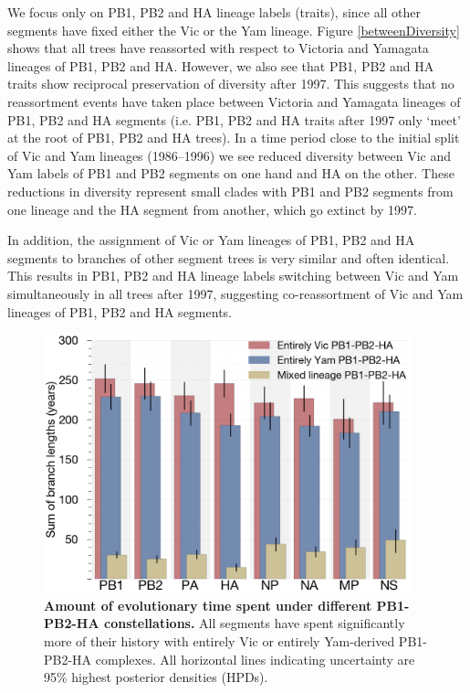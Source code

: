 \documentclass[11pt,oneside,letterpaper]{article}
\begin{document}
We focus only on PB1, PB2 and HA lineage labels (traits), since all other segments have fixed either the Vic or the Yam lineage.
Figure \ref{betweenDiversity} shows that all trees have reassorted with respect to Victoria and Yamagata lineages of PB1, PB2 and HA.
However, we also see that PB1, PB2 and HA traits show reciprocal preservation of diversity after 1997.
This suggests that no reassortment events have taken place between Victoria and Yamagata lineages of PB1, PB2 and HA segments (i.e. PB1, PB2 and HA traits after 1997 only `meet' at the root of PB1, PB2 and HA trees).
In a time period close to the initial split of Vic and Yam lineages (1986--1996) we see reduced diversity between Vic and Yam labels of PB1 and PB2 segments on one hand and HA on the other.
These reductions in diversity represent small clades with PB1 and PB2 segments from one lineage and the HA segment from another, which go extinct by 1997.

In addition, the assignment of Vic or Yam lineages of PB1, PB2 and HA segments to branches of other segment trees is very similar and often identical.
This results in PB1, PB2 and HA lineage labels switching between Vic and Yam simultaneously in all trees after 1997, suggesting co-reassortment of Vic and Yam lineages of PB1, PB2 and HA segments. 

\begin{figure}[h]
	\centering		
	\includegraphics[width=0.95\textwidth]{figures/InfB_stateTime.png}
	\caption{\textbf{Amount of evolutionary time spent under different PB1-PB2-HA constellations.}
All segments have spent significantly more of their history with entirely Vic or entirely Yam-derived PB1-PB2-HA complexes.
All horizontal lines indicating uncertainty are 95\% highest posterior densities (HPDs).}
	\label{stateTime}
\end{figure}
\end{document}
